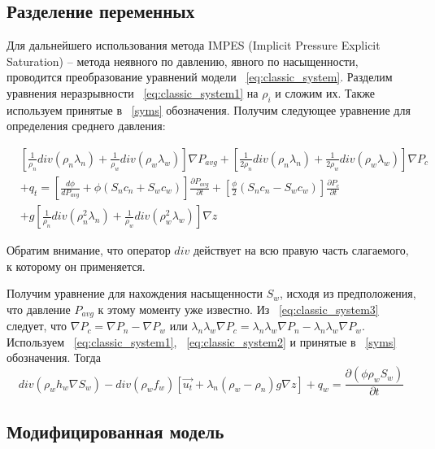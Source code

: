 \subsection{Разделение переменных}
\label{var_division}
Для дальнейшего использования метода IMPES (Implicit Pressure Explicit Saturation) -- метода неявного по давлению,
явного по насыщенности, проводится преобразование уравнений модели ~\eqref{eq:classic_system}.
Разделим уравнения неразрывности ~\eqref{eq:classic_system1} на $\rho_i$ 
и сложим их. Также используем принятые в ~\ref{syms} обозначения.
Получим следующее уравнение для определения среднего давления:

\begin{equation} \label{eq:classic_pressure}
 \begin{aligned}
  &\left[ \frac{1}{\rho_n} div (\rho_n\lambda_n) + \frac{1}{\rho_w} div (\rho_w\lambda_w) \right] \nabla P_{avg} + 
  \left[ \frac{1}{2\rho_n} div (\rho_n\lambda_n) + \frac{1}{2\rho_w} div (\rho_w\lambda_w) \right] \nabla P_c \\
  & + q_t = \left[ \frac{d\phi}{dP_{avg}} + \phi (S_n c_n + S_w c_w) \right] \frac{\partial P_{avg}}{\partial t} +
  \left[ \frac{\phi}{2} (S_n c_n - S_w c_w) \right] \frac{\partial P_{c}}{\partial t} \\
  & + g \left[ \frac{1}{\rho_n} div (\rho_n^2\lambda_n) + \frac{1}{\rho_w} div (\rho_w^2\lambda_w) \right] \nabla z
 \end{aligned}
\end{equation}

Обратим внимание, что оператор $div$ действует на всю правую часть слагаемого, к которому он применяется.

Получим уравнение для нахождения насыщенности $S_w$, исходя из предположения,
что давление $P_{avg}$ к этому моменту уже известно.
Из ~\eqref{eq:classic_system3} следует, что $\nabla P_c = \nabla P_n - \nabla P_w$ или
$\lambda_n\lambda_w\nabla P_c = \lambda_n\lambda_w\nabla P_n - \lambda_n\lambda_w\nabla P_w$.
Используем ~\eqref{eq:classic_system1}, ~\eqref{eq:classic_system2} и принятые в ~\ref{syms} обозначения.
Тогда
\begin{equation} \label{eq:classic_saturation}
  div(\rho_w h_w \nabla S_w) - div(\rho_w f_w)[\overrightarrow{u_t} + \lambda_n(\rho_w - \rho_n)g \nabla z] + q_w 
  = \frac{\partial (\phi \rho_w S_w)}{\partial t}
\end{equation} 
 
\subsection{Модифицированная модель}

